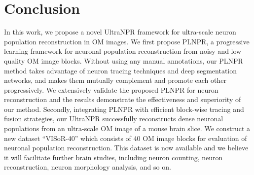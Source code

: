 \documentclass[journal]{IEEEtran}
\begin{document}





\section{Conclusion}
\label{sec:conclusion}
In this work, we propose a novel UltraNPR framework for ultra-scale neuron population reconstruction in OM images.
%
We first propose PLNPR, a progressive learning framework for neuronal population reconstruction from noisy and low-quality OM image blocks.
Without using any manual annotations, our PLNPR method takes advantage of neuron tracing techniques and deep segmentation networks, and makes them mutually complement and promote each other progressively.
We extensively validate the proposed PLNPR for neuron reconstruction and the results demonstrate the effectiveness and superiority of our method.
Secondly, integrating PLNPR with efficient block-wise tracing and fusion strategies, our UltraNPR successfully reconstructs dense neuronal populations from an ultra-scale OM image of a mouse brain slice.
%
We construct a new dataset ``VISoR-40'' which consists of 40 OM image blocks for evaluation of neuronal population reconstruction.
This dataset is now available and we believe it will facilitate further brain studies, including neuron counting, neuron reconstruction, neuron morphology analysis, and so on.


%
\end{document}
